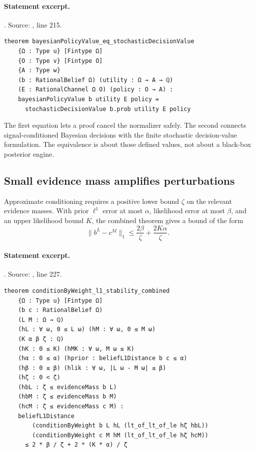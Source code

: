 \documentclass[11pt]{article}
\begin{document}
\paragraph{Statement excerpt.}. Source: , line 215.
\begin{lstlisting}[style=AVOCSource]
theorem bayesianPolicyValue_eq_stochasticDecisionValue
    {Ω : Type u} [Fintype Ω]
    {O : Type v} [Fintype O]
    {A : Type w}
    (b : RationalBelief Ω) (utility : Ω → A → ℚ)
    (E : RationalChannel Ω O) (policy : O → A) :
    bayesianPolicyValue b utility E policy =
      stochasticDecisionValue b.prob utility E policy
\end{lstlisting}


The first equation lets a proof cancel the normalizer safely. The second
connects signal-conditioned Bayesian decisions with the finite stochastic
decision-value formulation. The equivalence is about those defined values,
not about a black-box posterior engine.

\subsection{Small evidence mass amplifies perturbations}
Approximate conditioning requires a positive lower bound $\zeta$ on the
relevant evidence masses. With prior $\ell^1$ error at most $\alpha$, likelihood
error at most $\beta$, and an upper likelihood bound $K$, the combined theorem
gives a bound of the form
\[
 \|b^L-c^M\|_1\le \frac{2\beta}{\zeta}
                      +\frac{2K\alpha}{\zeta}.
\]

\paragraph{Statement excerpt.}. Source: , line 227.
\begin{lstlisting}[style=AVOCSource]
theorem conditionByWeight_l1_stability_combined
    {Ω : Type u} [Fintype Ω]
    (b c : RationalBelief Ω)
    (L M : Ω → ℚ)
    (hL : ∀ ω, 0 ≤ L ω) (hM : ∀ ω, 0 ≤ M ω)
    (K α β ζ : ℚ)
    (hK : 0 ≤ K) (hMK : ∀ ω, M ω ≤ K)
    (hα : 0 ≤ α) (hprior : beliefL1Distance b c ≤ α)
    (hβ : 0 ≤ β) (hlik : ∀ ω, |L ω - M ω| ≤ β)
    (hζ : 0 < ζ)
    (hbL : ζ ≤ evidenceMass b L)
    (hbM : ζ ≤ evidenceMass b M)
    (hcM : ζ ≤ evidenceMass c M) :
    beliefL1Distance
        (conditionByWeight b L hL (lt_of_lt_of_le hζ hbL))
        (conditionByWeight c M hM (lt_of_lt_of_le hζ hcM))
      ≤ 2 * β / ζ + 2 * (K * α) / ζ
\end{lstlisting}
\end{document}
